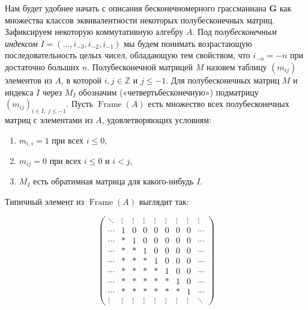 \documentclass{article}
\theoremstyle{definition}
\theoremstyle{definition} %
\theoremstyle{remark}     %
\theoremstyle{definition}
\theoremstyle{definition}
\theoremstyle{definition}
\theoremstyle{definition}
\theoremstyle{definition}
\theoremstyle{definition}
\theoremstyle{definition}
\theoremstyle{definition}
\begin{document}
Нам будет удобнее начать с описания бесконечномерного грассманиана \(\mathbf{G}\) как множества классов эквивалентности некоторых полубесконечных матриц. Зафиксируем некоторую коммутативную алгебру \(A\). Под \textit{полубесконечным индексом} \(I = (\dots, i_{-3}, i_{-2}, i_{-1})\) мы будем понимать возрастающую последовательность целых чисел, обладающую тем свойством, что \(i_{-n} = -n\) при достаточно больших \(n\). Полубесконечной матрицей \(M\) назовем таблицу \((m_{ij})\) элементов из \(A\), в которой \(i, j \in \mathbb{Z}\) и \(j \le -1\). Для полубесконечных матриц \(M\) и индекса \(I\) через \(M_I\) обозначим («четвертьбесконечную») подматрицу \((m_{ij})_{i \in I,\; j \le -1}\). Пусть \(\operatorname{Frame}(A)\) есть множество всех полубесконечных матриц с элементами из \(A\), удовлетворяющих условиям:

\begin{enumerate}
  \item \(m_{i,i} = 1\) при всех \(i \le 0\),
  \item \(m_{ij} = 0\) при всех \(i \le 0\) и \(i < j\),
  \item \(M_I\) есть обратимная матрица для какого-нибудь \(I\).
\end{enumerate}

Типичный элемент из \(\operatorname{Frame}(A)\) выглядит так:






\[
\begin{pmatrix}
\ddots & \vdots & \vdots & \vdots & \vdots & \vdots & \vdots & \vdots & \vdots \\
\cdots & 1 & 0 & 0 & 0 & 0 & 0 & 0 & \cdots \\
\cdots & * & 1 & 0 & 0 & 0 & 0 & 0 & \cdots \\
\cdots & * & * & 1 & 0 & 0 & 0 & 0 & \cdots \\
\cdots & * & * & * & 1 & 0 & 0 & 0 & \cdots \\
\cdots & * & * & * & * & 1 & 0 & 0 & \cdots \\
\cdots & * & * & * & * & * & 1 & 0 & \cdots \\
\cdots & * & * & * & * & * & * & 1 & \cdots \\
\vdots & \vdots & \vdots & \vdots & \vdots & \vdots & \vdots & \vdots & \ddots
\end{pmatrix}
\]
\end{document}
